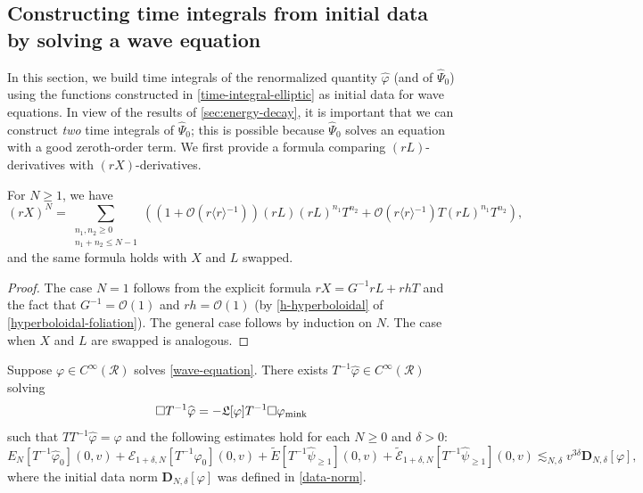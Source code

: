 \documentclass[10pt, reqno]{amsart}
\begin{document}
\subsection{Constructing time integrals from initial data by solving a wave equation}
\label{time-integrals-from-data} In this section, we build time integrals of the
renormalized quantity \(\widehat{\varphi{}}\) (and of \(\widehat{\Psi{}}_0\))
using the functions constructed in \cref{time-integral-elliptic} as initial data
for wave equations. In view of the results of \cref{sec:energy-decay}, it is
important that we can construct \emph{two} time integrals of \(\widehat{\Psi{}}_0\);
this is possible because \(\widehat{\Psi{}}_0\) solves an equation with a good
zeroth-order term. We first provide a formula comparing \((rL)\)-derivatives
with \((rX)\)-derivatives.
\begin{lemma}
For \(N\ge 1\), we have
\begin{equation}
(rX)^N = \sum_{\substack{n_1,n_2\ge 0 \\ n_1 + n_2 \le  N-1}}((1 + \mathcal{O}(r\langle{}r\rangle{}^{-1}))(rL)(rL)^{n_1}T^{n_2} + \mathcal{O}(r\langle{}r\rangle{}^{-1})T(rL)^{n_1}T^{n_2}),
\end{equation}
and the same formula holds with \(X\) and \(L\) swapped.
\label{rL-rX-comparison}
\end{lemma}
\begin{proof}
The case \(N = 1\) follows from the explicit formula \(rX = G^{-1}rL + rhT\) and
the fact that \(G^{-1} = \mathcal{O}(1)\) and \(rh = \mathcal{O}(1)\) (by
\cref{h-hyperboloidal} of \cref{hyperboloidal-foliation}). The general case follows by
induction on \(N\). The case when \(X\) and \(L\) are swapped is analogous.
\end{proof}
\begin{proposition}
Suppose \(\varphi{}\in C^\infty(\mathcal{R})\) solves \cref{wave-equation}. There exists
\(T^{-1}\widehat{\varphi{}}\in C^\infty(\mathcal{R})\) solving
\begin{equation}
\Box{}T^{-1}\widehat{\varphi{}} = -\mathfrak{L}[\varphi{}]T^{-1}\Box{}\varphi{}_{\textnormal{mink}}
\end{equation}
such that \(TT^{-1}\widehat{\varphi{}} = \widehat{\varphi{}}\) and the following estimates hold
for each \(N\ge 0\) and \(\delta{} > 0\):
\begin{equation}\label{Tinv-phi-estimates}
E_N[T^{-1}\widehat{\varphi{}}_0](0,v) + \mathcal{E}_{1+\delta{},N}[T^{-1}\widehat{\varphi{}}_0](0,v) + \tilde{E}[T^{-1}\widehat{\psi{}}_{\ge 1}](0,v) + \tilde{\mathcal{E}}_{1+\delta{},N}[T^{-1}\widehat{\psi{}}_{\ge 1}](0,v)\lesssim_{N,\delta{}} v^{3\delta{}}\mathbf{D}_{N,\delta{}}[\varphi{}],
\end{equation}
where the initial data norm \(\mathbf{D}_{N,\delta{}}[\varphi{}]\) was defined in \cref{data-norm}.
\label{Tinv-phi}
\end{proposition}
\end{document}
